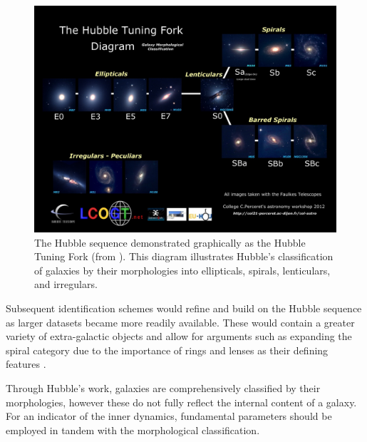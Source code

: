 \documentclass[12pt, twocolumn]{revtex4-1}    %
\begin{document}
\begin{figure}
\includegraphics[width=\textwidth]{introduction/hubble-tuning-fork-diagram}
\caption{The Hubble sequence demonstrated graphically as the Hubble Tuning Fork (from \citealt{hubble_tuning_fork}). This diagram illustrates Hubble's classification of galaxies by their morphologies into ellipticals, spirals, lenticulars, and irregulars.}
\label{fig:hubble_tuning_fork}
\end{figure}


Subsequent identification schemes would refine and build on the Hubble sequence as larger datasets became more readily available. These would contain a greater variety of extra-galactic objects and allow for arguments such as expanding the spiral category due to the importance of rings and lenses as their defining features \citep{1959HDP....53..275D}. 

Through Hubble's work, galaxies are comprehensively classified by their morphologies, however these do not fully reflect the internal content of a galaxy. For an indicator of the inner dynamics, fundamental parameters should be employed in tandem with the morphological classification. 
\end{document}
